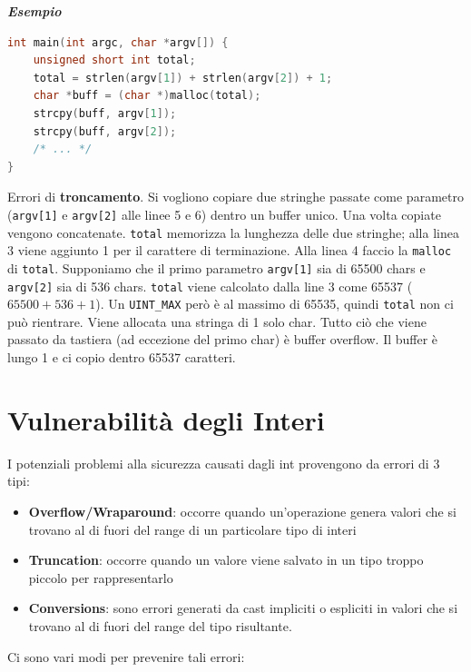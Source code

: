 \textbf{\textit{Esempio}}

\begin{lstlisting}[language=C,  basicstyle=\scriptsize]
int main(int argc, char *argv[]) {
    unsigned short int total;
    total = strlen(argv[1]) + strlen(argv[2]) + 1;
    char *buff = (char *)malloc(total);
    strcpy(buff, argv[1]);
    strcpy(buff, argv[2]);
    /* ... */
}\end{lstlisting}

Errori di \textbf{troncamento}. Si vogliono copiare due stringhe passate come
parametro (\verb|argv[1]| e \verb|argv[2]| alle linee 5 e 6) dentro un buffer unico.
Una volta copiate vengono concatenate. \verb|total| memorizza la lunghezza delle
due stringhe; alla linea 3 viene aggiunto 1 per il carattere di terminazione.
Alla linea 4 faccio la \verb|malloc| di \verb|total|. Supponiamo che il primo
parametro \verb|argv[1]| sia di 65500 chars e \verb|argv[2]| sia di 536 chars.
\verb|total| viene calcolato dalla line 3 come 65537 (\(65500 + 536 + 1\)). Un
\verb|UINT_MAX| però è al massimo di 65535, quindi \verb|total| non ci può rientrare.
Viene allocata una stringa di 1 solo char. Tutto ciò che viene passato da
tastiera (ad eccezione del primo char) è buffer overflow. Il buffer è lungo 1 e
ci copio dentro 65537 caratteri.

\section{Vulnerabilità degli Interi}

I potenziali problemi alla sicurezza causati dagli int provengono da errori di 3 tipi:

\begin{itemize}
    \item \textbf{Overflow/Wraparound}: occorre quando un'operazione genera valori
          che si trovano al di fuori del range di un particolare tipo di interi
    \item \textbf{Truncation}: occorre quando un valore viene salvato in un tipo
          troppo piccolo per rappresentarlo
    \item \textbf{Conversions}: sono errori generati da cast impliciti o espliciti
          in valori che si trovano al di fuori del range del tipo risultante.
\end{itemize}

Ci sono vari modi per prevenire tali errori:


